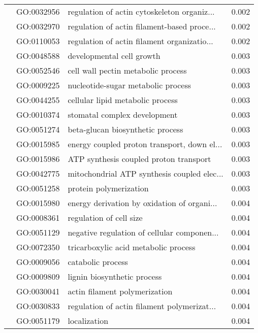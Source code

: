 \begin{longtable}{lllr}
   & GO:0032956 &  regulation of actin cytoskeleton organiz... &         0.002 \\
   & GO:0032970 &  regulation of actin filament-based proce... &         0.002 \\
   & GO:0110053 &  regulation of actin filament organizatio... &         0.002 \\
   & GO:0048588 &                    developmental cell growth &         0.003 \\
   & GO:0052546 &           cell wall pectin metabolic process &         0.003 \\
   & GO:0009225 &           nucleotide-sugar metabolic process &         0.003 \\
   & GO:0044255 &             cellular lipid metabolic process &         0.003 \\
   & GO:0010374 &                 stomatal complex development &         0.003 \\
   & GO:0051274 &             beta-glucan biosynthetic process &         0.003 \\
   & GO:0015985 &  energy coupled proton transport, down el... &         0.003 \\
   & GO:0015986 &       ATP synthesis coupled proton transport &         0.003 \\
   & GO:0042775 &  mitochondrial ATP synthesis coupled elec... &         0.003 \\
   & GO:0051258 &                       protein polymerization &         0.003 \\
   & GO:0015980 &  energy derivation by oxidation of organi... &         0.004 \\
   & GO:0008361 &                      regulation of cell size &         0.004 \\
   & GO:0051129 &  negative regulation of cellular componen... &         0.004 \\
   & GO:0072350 &         tricarboxylic acid metabolic process &         0.004 \\
   & GO:0009056 &                            catabolic process &         0.004 \\
   & GO:0009809 &                  lignin biosynthetic process &         0.004 \\
   & GO:0030041 &                actin filament polymerization &         0.004 \\
   & GO:0030833 &  regulation of actin filament polymerizat... &         0.004 \\
   & GO:0051179 &                                 localization &         0.004 \\

\end{longtable}
